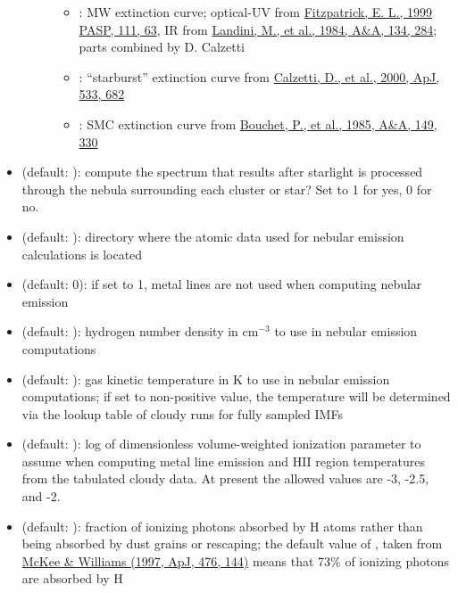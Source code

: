 \documentclass[letterpaper,10pt,english]{sphinxmanual}
\begin{document}
\begin{itemize}
\begin{description}
\begin{itemize}
\item {} 
 : MW extinction curve; optical-UV from \href{http://adsabs.harvard.edu/abs/1999PASP..111...63F}{Fitzpatrick, E. L., 1999 PASP, 111, 63}, IR from \href{http://adsabs.harvard.edu/abs/1984A\%26A...134..284L}{Landini, M., et al., 1984, A\&A, 134, 284}; parts combined by D. Calzetti

\item {} 
 : ``starburst'' extinction curve from \href{http://adsabs.harvard.edu/abs/2000ApJ...533..682C}{Calzetti, D., et al., 2000, ApJ, 533, 682}

\item {} 
 : SMC extinction curve from \href{http://adsabs.harvard.edu/abs/1985A\%26A...149..330B}{Bouchet, P., et al., 1985, A\&A, 149, 330}

\end{itemize}

\end{description}

\item {} 
 (default: ): compute the spectrum that results after starlight is processed through the nebula surrounding each cluster or star? Set to 1 for yes, 0 for no.

\item {} 
 (default: ): directory where the atomic data used for nebular emission calculations is located

\item {} 
 (default: 0): if set to 1, metal lines are not used when computing nebular emission

\item {} 
 (default: ): hydrogen number density in \(\mathrm{cm}^{-3}\) to use in nebular emission computations

\item {} 
 (default: ): gas kinetic temperature in K to use in nebular emission computations; if set to non-positive value, the temperature will be determined via the lookup table of cloudy runs for fully sampled IMFs

\item {} 
 (default: ): log of dimensionless volume-weighted ionization parameter to assume when computing metal line emission and HII region temperatures from the tabulated cloudy data. At present the allowed values are -3, -2.5, and -2.

\item {} 
 (default: ): fraction of ionizing photons absorbed by H atoms rather than being absorbed by dust grains or rescaping; the default value of , taken from \href{http://adsabs.harvard.edu/abs/1997ApJ...476..144M}{McKee \& Williams (1997, ApJ, 476, 144)} means that 73\% of ionizing photons are absorbed by H

\end{itemize}
\end{document}
